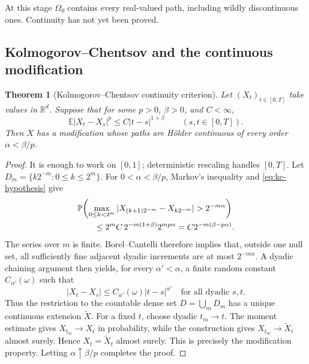 \documentclass[10pt,a4paper]{article}
\numberwithin{equation}{section}
\theoremstyle{blueplain}
\newtheorem{theorem}{Theorem}[section]
\theoremstyle{definition}
\newcommand{\E}{\mathbb E}
\newcommand{\Pp}{\mathbb P}
\newcommand{\R}{\mathbb R}
\begin{document}
At this stage \(\Omega_0\) contains every real-valued path, including wildly
discontinuous ones.  Continuity has not yet been proved.

\subsection{Kolmogorov--Chentsov and the continuous modification}

\begin{theorem}[Kolmogorov--Chentsov continuity criterion]
Let \((X_t)_{t\in[0,T]}\) take values in \(\R^d\).  Suppose that for some
\(p>0\), \(\beta>0\), and \(C<\infty\),
\begin{equation}
  \E|X_t-X_s|^p\le C|t-s|^{1+\beta}
  \qquad(s,t\in[0,T]).
  \label{eq:kc-hypothesis}
\end{equation}
Then \(X\) has a modification whose paths are H\"older continuous of every
order \(\alpha<\beta/p\).
\end{theorem}

\begin{proof}
It is enough to work on \([0,1]\); deterministic rescaling handles \([0,T]\).
Let \(D_m=\{k2^{-m}:0\le k\le2^m\}\).  For
\(0<\alpha<\beta/p\), Markov's inequality and
\eqref{eq:kc-hypothesis} give
\begin{align}
 &\Pp\!\left(
   \max_{0\le k<2^m}
   |X_{(k+1)2^{-m}}-X_{k2^{-m}}|>2^{-m\alpha}
 \right)\notag\\
 &\qquad\le
 2^m C\,2^{-m(1+\beta)}2^{mp\alpha}
 =C2^{-m(\beta-p\alpha)}.
 \label{eq:kc-dyadic-bound}
\end{align}
The series over \(m\) is finite.  Borel--Cantelli therefore implies that,
outside one null set, all sufficiently fine adjacent dyadic increments are at
most \(2^{-m\alpha}\).  A dyadic chaining argument then yields, for every
\(\alpha'<\alpha\), a finite random constant \(C_{\alpha'}(\omega)\) such
that
\begin{equation}
  |X_t-X_s|\le C_{\alpha'}(\omega)|t-s|^{\alpha'}
  \quad\text{for all dyadic }s,t.
  \label{eq:kc-dyadic-holder}
\end{equation}
Thus the restriction to the countable dense set
\(D=\bigcup_mD_m\) has a unique continuous extension \(\widetilde X\).
For a fixed \(t\), choose dyadic \(t_m\to t\).  The moment estimate gives
\(X_{t_m}\to X_t\) in probability, while the construction gives
\(X_{t_m}\to\widetilde X_t\) almost surely.  Hence
\(X_t=\widetilde X_t\) almost surely.  This is precisely the modification
property.  Letting \(\alpha\uparrow\beta/p\) completes the proof.
\end{proof}
\end{document}
